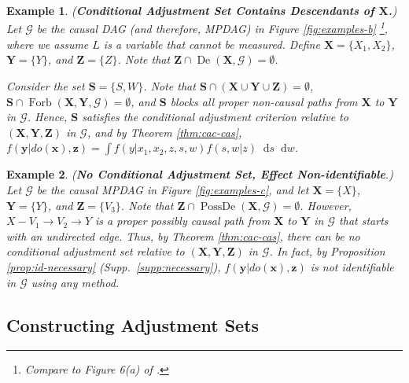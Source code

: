\documentclass[twoside]{article}
\newtheorem{example}{Example}
\DeclareMathOperator{\De}{De}
\DeclareMathOperator{\PossDe}{PossDe}
\DeclareMathOperator{\Forb}{Forb}
\newcommand{\fb}[2][X,Y]{\Forb(\mb{#1},#2)}
\newcommand{\mb}[1]{\mathbf{#1}}
\newcommand{\g}[1][G]{\mathcal{#1}}
\newcommand*\diff{\mathop{}\!\mathrm{d}}
\begin{document}

\begin{example}
\label{ex:cas-descendants}
{\normalfont (\textbf{Conditional Adjustment Set Contains Descendants of $\mb{X}$.})}
    Let $\g$ be the causal DAG (and therefore, MPDAG) in Figure \ref{fig:examples-b} \footnote{Compare to Figure 6(a) of \cite{perkovic2018complete}.}, where we assume $L$ is a variable that cannot be measured. Define $\mb{X} = \{X_1,X_2\}$, $\mb{Y}=\{Y\}$, and $\mb{Z} = \{Z\}$. Note that $\mb{Z} \cap \De(\mb{X}, \g) = \emptyset$.
    
    Consider the set $\mb{S} = \{S,W\}$. Note that $\mb{S} \cap (\mb{X} \cup \mb{Y} \cup \mb{Z}) = \emptyset$, $\mb{S} \cap \fb{\g} = \emptyset$, and $\mb{S}$ blocks all proper non-causal paths from $\mb{X}$ to $\mb{Y}$ in $\g$. Hence, $\mb{S}$ satisfies the conditional adjustment criterion relative to $(\mb{X,Y,Z})$ in $\g$, and by Theorem \ref{thm:cac-cas}, $f(\mb{y}|do(\mb{x}), \mb{z}) = \int f(y | x_1,x_2,z,s,w) f(s,w|z) \diff s \diff w$.
\end{example}





\begin{example}
\label{ex:nocas-noamen}
{\normalfont (\textbf{No Conditional Adjustment Set, Effect Non-identifiable}.)}
    Let $\g$ be the causal MPDAG in Figure \ref{fig:examples-c}, and let $\mb{X} = \{X\}$, $\mb{Y}=\{Y\}$, and $\mb{Z}=\{V_3\}$. Note that $\mb{Z} \cap \PossDe(\mb{X}, \g) = \emptyset$. However, $X - V_1 \to V_2 \to Y$ is a proper possibly causal path from $\mb{X}$ to $\mb{Y}$ in $\g$ that starts with an undirected edge. Thus, by Theorem \ref{thm:cac-cas}, there can be no conditional adjustment set relative to $(\mb{X,Y,Z})$ in $\g$. In fact, by Proposition \ref{prop:id-necessary} (Supp.\ \ref{supp:necessary}), $f(\mb{y}| do(\mb{x}), \mb{z})$ is not identifiable in $\g$ using any method. 
\end{example}











\subsection{Constructing Adjustment Sets}
\label{sec:constructing}
\end{document}
